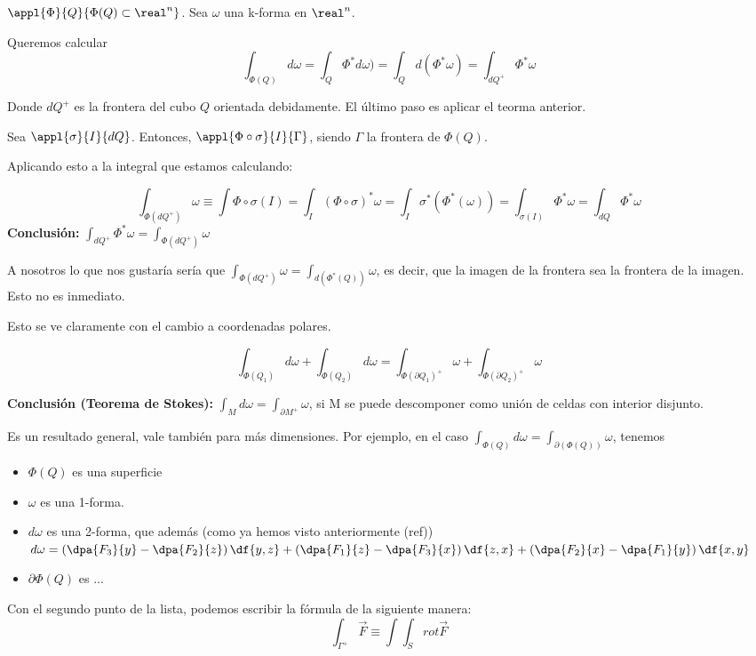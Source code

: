 

$\appl{\Phi}{Q}{\Phi(Q)\subset\real^n}$. Sea $\omega$ una k-forma en $\real^n$.

Queremos calcular \[
\int_{\Phi(Q)} d\omega = \int_Q \Phi^{\ast}d\omega) = \int_Q d(\Phi^{\ast}\omega) = \int_{dQ^{+}} \Phi^{\ast}\omega
\]

Donde $dQ^{+}$ es la frontera del cubo $Q$ orientada debidamente. El último paso es aplicar el teorma anterior.

Sea $\appl{\sigma}{I}{dQ}$. Entonces, $\appl{\Phi\circ\sigma}{I}{\Gamma}$, siendo $\Gamma$ la frontera de $\Phi(Q)$.

Aplicando esto a la integral que estamos calculando:

\[
\int_{\Phi(dQ^{+})} \omega \equiv \int{\Phi\circ\sigma(I)} = \int_I (\Phi\circ\sigma)^{\ast} \omega = \int_I \sigma^{\ast}\left(\Phi^{\ast}(\omega)\right) = \int_{\sigma(I)} \Phi^{\ast}\omega = \int_{dQ}\Phi^{\ast}\omega
\]
\textbf{Conclusión:} $\displaystyle \int_{dQ^+} \Phi^{\ast} \omega = \int_{\Phi(dQ^+)} \omega$


A nosotros lo que nos gustaría sería que $\displaystyle\int_{\Phi(dQ^+)} \omega = \int_{d(\Phi^{\ast}(Q))} \omega$, es decir, que la imagen de la frontera sea la frontera de la imagen. Esto no es inmediato.

Esto se ve claramente con el cambio a coordenadas polares.

\[
\int_{\Phi(Q_1)}d\omega + \int_{\Phi(Q_2)}d\omega=
\int_{\Phi(\partial  Q_1)^+}\omega+\int_{\Phi(\partial  Q_2)^+}\omega
\]

\textbf{Conclusión (Teorema de Stokes):} $\displaystyle\int_M d\omega = \int_{\partial  M^+}\omega$, si M se puede descomponer como unión de celdas con interior disjunto.

\obs Es un resultado general, vale también para más dimensiones. Por ejemplo, en el caso $\displaystyle \int_{\Phi(Q)} d\omega = \int_{\partial (\Phi(Q))} \omega$, tenemos
\begin{itemize}
\item $\Phi(Q)$ es una superficie
\item $\omega$ es una 1-forma.
\item $d\omega$ es una 2-forma, que además (como ya hemos visto anteriormente (ref)) $d\omega = \left(\dpa{F_3}{y}-\dpa{F_2}{z}\right) \df{y,z} + 
\left(\dpa{F_1}{z}-\dpa{F_3}{x}\right) \df{z,x} + 
\left(\dpa{F_2}{x}-\dpa{F_1}{y}\right) \df{x,y}$
\item $\partial \Phi(Q)$ es ... 
\end{itemize} 
Con el segundo punto de la lista, podemos escribir la fórmula de la siguiente manera:
\[
\int_{\Gamma^+} \overrightarrow{F} \equiv \int \int_S rot \overrightarrow{F}
\]

